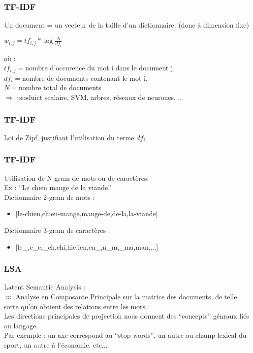 \begin{frame}
  \frametitle{TF-IDF}
  Un document = un vecteur de la taille d'un dictionnaire. (donc à dimension fixe) \\
  \begin{center}
    $\boxed{w_{i,j} = tf_{i,j}*\log{\frac{N}{df_i}}}$
  \end{center}
  où : \\
  $tf_{i,j} = $nombre d'occurence du mot i dans le document j, \\
  $df_i = $nombre de documents contenant le mot i, \\
  $N = $nombre total de documents \\
  \newline
  $\Rightarrow$ produict scalaire, SVM, arbres, réseaux de neurones, ...
\end{frame}

\begin{frame}
  \frametitle{TF-IDF}
  Loi de Zipf, justifiant l'utilisation du terme $df_i$
\end{frame}

\begin{frame}
  \frametitle{TF-IDF}
  Utilisation de N-gram de mots ou de caractères. \\
  \newline
  Ex : ``Le chien mange de la viande''\\
  Dictionnaire 2-gram de mots : \\
  \newline
  \begin{itemize}
  \item {[le-chien,chien-mange,mange-de,de-la,la-viande]}
  \end{itemize}
  Dictionnaire 3-gram de caractères :
  \begin{itemize}
  \item {[le\_,e\_c,\_ch,chi,hie,ien,en\_,n\_m,\_ma,man,...]}
  \end{itemize}
\end{frame}

\begin{frame}
  \frametitle{LSA}
  Latent Semantic Analysis : \\
  \newline
  $\approx$ Analyse en Composante Principale sur la matrice des documents, de telle sorte qu'on obtient des relations entre les mots. \\
  Les directions principales de projection nous donnent des ``concepts'' génraux liés au langage. \\
  \newline
  Par exemple : un axe correspond au ``stop words'', un autre au champ lexical du sport, un autre à l'économie, etc...  
\end{frame}

